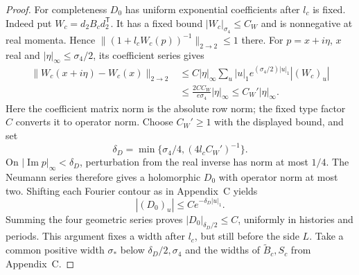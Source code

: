 \documentclass[11pt,reqno]{amsart}
\numberwithin{equation}{section}
\theoremstyle{definition}
\theoremstyle{remark}
\begin{document}
\begin{proof}
For completeness \(D_0\) has uniform exponential coefficients
after \(l_c\) is fixed. Indeed put \(W_c=d_2B_cd_2^{\mathsf T}\).
It has a fixed bound \(|W_c|_{\sigma_4}\le C_W\) and is
nonnegative at real momenta. Hence
\(\|(1+l_cW_c(p))^{-1}\|_{2\to2}\le1\) there.
For \(p=x+i\eta\), \(x\) real and
\(|\eta|_\infty\le\sigma_4/2\), its coefficient series gives
\[
 \begin{split}
 \|W_c(x+i\eta)-W_c(x)\|_{2\to2}
 &\le C|\eta|_\infty
       \sum_u |u|_1e^{(\sigma_4/2)|u|_1}|(W_c)_u|\\
 &\le \frac{2CC_W}{e\sigma_4}|\eta|_\infty
       \le C_W'|\eta|_\infty .
 \end{split}
\]
Here the coefficient matrix norm is the absolute row norm;
the fixed type factor \(C\) converts it to operator norm.
Choose \(C_W'\ge1\) with the displayed bound, and set
\[
          \delta_D=\min\{\sigma_4/4,(4l_cC_W')^{-1}\}.
\]
On \(|\operatorname{Im}p|_\infty<\delta_D\), perturbation
from the real inverse has norm at most \(1/4\).
The Neumann series therefore gives a holomorphic \(D_0\)
with operator norm at most two. Shifting each Fourier
contour as in Appendix~C yields
\[
                     |(D_0)_u|\le C e^{-\delta_D|u|_1}.
\]
Summing the four geometric series proves
\(|D_0|_{\delta_D/2}\le C\), uniformly in histories and
periods. This argument fixes a width after \(l_c\), but
still before the side \(L\). Take a common positive width
\(\sigma_*\) below \(\delta_D/2,\sigma_4\) and the widths
of \(\widetilde B_c,S_c\) from Appendix~C.


\end{proof}
\end{document}
